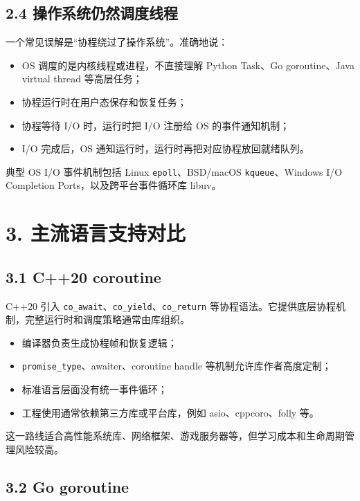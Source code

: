 \documentclass[
  11pt,
  a4paper,
]{article}
\providecommand{\tightlist}{%
  \setlength{\itemsep}{0pt}\setlength{\parskip}{0pt}}
\begin{document}
\subsection{2.4
操作系统仍然调度线程}\label{ux64cdux4f5cux7cfbux7edfux4ecdux7136ux8c03ux5ea6ux7ebfux7a0b}

一个常见误解是``协程绕过了操作系统''。准确地说：

\begin{itemize}
\tightlist
\item
  OS 调度的是内核线程或进程，不直接理解 Python Task、Go goroutine、Java
  virtual thread 等高层任务；
\item
  协程运行时在用户态保存和恢复任务；
\item
  协程等待 I/O 时，运行时把 I/O 注册给 OS 的事件通知机制；
\item
  I/O 完成后，OS 通知运行时，运行时再把对应协程放回就绪队列。
\end{itemize}

典型 OS I/O 事件机制包括 Linux \texttt{epoll}、BSD/macOS
\texttt{kqueue}、Windows I/O Completion Ports，以及跨平台事件循环库
libuv。

\section{3.
主流语言支持对比}\label{ux4e3bux6d41ux8bedux8a00ux652fux6301ux5bf9ux6bd4}

\subsection{3.1 C++20 coroutine}\label{c20-coroutine}

C++20 引入 \texttt{co\_await}、\texttt{co\_yield}、\texttt{co\_return}
等协程语法。它提供底层协程机制，完整运行时和调度策略通常由库组织。

\begin{itemize}
\tightlist
\item
  编译器负责生成协程帧和恢复逻辑；
\item
  \texttt{promise\_type}、awaiter、coroutine handle
  等机制允许库作者高度定制；
\item
  标准语言层面没有统一事件循环；
\item
  工程使用通常依赖第三方库或平台库，例如 asio、cppcoro、folly 等。
\end{itemize}

这一路线适合高性能系统库、网络框架、游戏服务器等，但学习成本和生命周期管理风险较高。

\subsection{3.2 Go goroutine}\label{go-goroutine}
\end{document}

